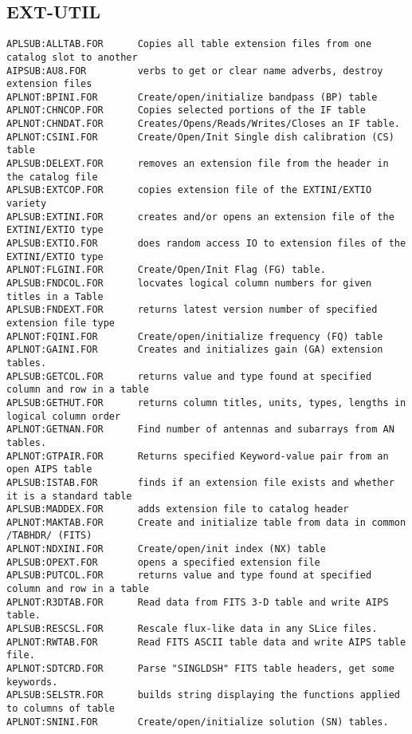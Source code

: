 \subsection{EXT-UTIL}
\begin{verbatim}
APLSUB:ALLTAB.FOR      Copies all table extension files from one catalog slot to another
AIPSUB:AU8.FOR         verbs to get or clear name adverbs, destroy extension files
APLNOT:BPINI.FOR       Create/open/initialize bandpass (BP) table
APLNOT:CHNCOP.FOR      Copies selected portions of the IF table
APLNOT:CHNDAT.FOR      Creates/Opens/Reads/Writes/Closes an IF table.
APLNOT:CSINI.FOR       Create/Open/Init Single dish calibration (CS) table
APLSUB:DELEXT.FOR      removes an extension file from the header in the catalog file
APLSUB:EXTCOP.FOR      copies extension file of the EXTINI/EXTIO variety
APLSUB:EXTINI.FOR      creates and/or opens an extension file of the EXTINI/EXTIO type
APLSUB:EXTIO.FOR       does random access IO to extension files of the EXTINI/EXTIO type
APLNOT:FLGINI.FOR      Create/Open/Init Flag (FG) table.
APLSUB:FNDCOL.FOR      locvates logical column numbers for given titles in a Table
APLSUB:FNDEXT.FOR      returns latest version number of specified extension file type
APLNOT:FQINI.FOR       Create/open/initialize frequency (FQ) table
APLNOT:GAINI.FOR       Creates and initializes gain (GA) extension tables.
APLSUB:GETCOL.FOR      returns value and type found at specified column and row in a table
APLSUB:GETHUT.FOR      returns column titles, units, types, lengths in logical column order
APLNOT:GETNAN.FOR      Find number of antennas and subarrays from AN tables.
APLNOT:GTPAIR.FOR      Returns specified Keyword-value pair from an open AIPS table
APLSUB:ISTAB.FOR       finds if an extension file exists and whether it is a standard table
APLSUB:MADDEX.FOR      adds extension file to catalog header
APLNOT:MAKTAB.FOR      Create and initialize table from data in common /TABHDR/ (FITS)
APLNOT:NDXINI.FOR      Create/open/init index (NX) table
APLSUB:OPEXT.FOR       opens a specified extension file
APLSUB:PUTCOL.FOR      returns value and type found at specified column and row in a table
APLNOT:R3DTAB.FOR      Read data from FITS 3-D table and write AIPS table.
APLSUB:RESCSL.FOR      Rescale flux-like data in any SLice files.
APLNOT:RWTAB.FOR       Read FITS ASCII table data and write AIPS table file.
APLNOT:SDTCRD.FOR      Parse "SINGLDSH" FITS table headers, get some keywords.
APLSUB:SELSTR.FOR      builds string displaying the functions applied to columns of table
APLNOT:SNINI.FOR       Create/open/initialize solution (SN) tables.

\end{verbatim}
